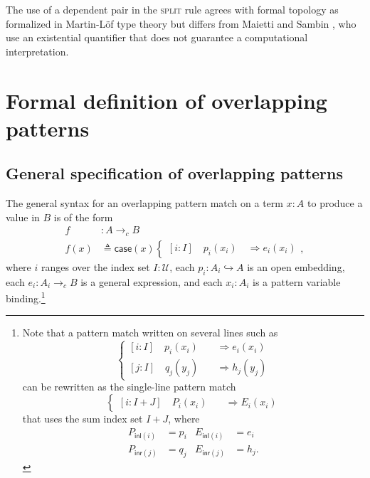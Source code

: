 \documentclass[conference]{IEEEtran}
\newtheorem{definition}{Definition}
\newcommand{\hookto}{\hookrightarrow}
\newcommand{\cto}{\to_c}
\newcommand{\Type}{\mathcal{U}}
\newcommand{\Open}[1]{\mathcal{O}({#1})}
\newcommand{\irule}[1]{\textsc{#1}}
\newcommand{\Branch}{\Rightarrow}
\newcommand{\comment}[1]{}
\begin{document}
The use of a dependent pair in the \irule{split} rule agrees with formal topology as formalized in Martin-L\"of type theory but differs from Maietti and Sambin \cite{whypointfree}, who use an existential quantifier that does not guarantee a computational interpretation.

\comment{
\begin{definition}
An \emph{inductively generated formal space} is a preorder $S$ together with a function 
\[
C : S \to \Sigma (I : \Type).\ I \to (S \to \Type),
\]
called an \emph{axiom set}.
\end{definition}

The preorder $S$ represents a base for the opens of the space. The construction in \cite{coquand2003} generates the ``free'' space $X$ whose base is $S$, with an inclusion of the base $y : S \to \Open{X}$ that satisfies, for each $s : S$, letting $(I, U) = C(s)$, for any $i : I$, 
\begin{mathpar}
\inferrule*
  {}
  {ya \le \bigvee_{b : U_i} yb}
\end{mathpar}
}

\section{Formal definition of overlapping patterns}
\label{s:patterns}

\subsection{General specification of overlapping patterns}
The general syntax for an overlapping pattern match on a term $x : A$ to produce a value in $B$ is of the form
\begin{align*}
f &: A \cto B
\\ f(x) &\triangleq \mathsf{case}(x)
\begin{cases}
[i : I] \quad p_i(x_i) \quad \Branch e_i(x_i)
\end{cases},
\end{align*}
where $i$ ranges over the index set $I : \Type$, each $p_i : A_i \hookto A$ is an open embedding, each $e_i : A_i \cto B$ is a general expression, and each $x_i : A_i$ is a pattern variable binding.\footnote{
Note that a pattern match written on several lines such as
\[
\begin{cases}
[i : I] \quad p_i(x_i) \quad &\Branch e_i(x_i)
\\ [j : I] \quad q_j(y_j) \quad &\Branch h_j(y_j)
\end{cases}
\]
can be rewritten as the single-line pattern match
\[
\begin{cases}
[i : I + J] \quad P_i(x_i) \quad &\Branch E_i(x_i)
\end{cases}
\]
that uses the sum index set $I + J$, where
\begin{align*}
P_{\mathsf{inl}(i)} &= p_i
& E_{\mathsf{inl}(i)} &= e_i
\\ P_{\mathsf{inr}(j)} &= q_j
& E_{\mathsf{inr}(j)} &= h_j.
\end{align*}
}
\end{document}
